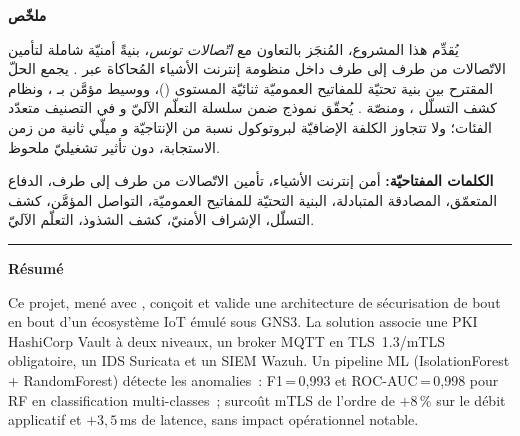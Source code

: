 \clearpage
\thispagestyle{empty}
\pagestyle{empty}

\begingroup
\setlength{\parskip}{0pt}
\setlength{\parindent}{0pt}
\renewcommand{\baselinestretch}{1.1}
\footnotesize

\begin{Arabic}
\begin{center}
  \textbf{\normalsize ملخّص}
\end{center}
\noindent يُقدِّم هذا المشروع، المُنجَز بالتعاون مع \emph{اتّصالات تونس}، بنيةً أمنيّة شاملة لتأمين الاتّصالات
من طرف إلى طرف داخل منظومة إنترنت الأشياء المُحاكاة عبر . يجمع الحلّ المقترح بين بنية تحتيّة للمفاتيح
العموميّة ثنائيّة المستوى ()، ووسيط  مؤمَّن بـ ، ونظام كشف التسلّل ،
ومنصّة . يُحقّق نموذج  ضمن سلسلة التعلّم الآليّ
 و في التصنيف متعدّد الفئات؛ ولا تتجاوز الكلفة الإضافيّة لبروتوكول 
نسبة  من الإنتاجيّة و ميلّي ثانية من زمن الاستجابة، دون تأثير تشغيليّ ملحوظ.

\smallskip
\noindent\textbf{الكلمات المفتاحيّة:}
أمن إنترنت الأشياء، تأمين الاتّصالات من طرف إلى طرف، الدفاع المتعمّق، المصادقة المتبادلة، البنية التحتيّة للمفاتيح العموميّة، التواصل  المؤمَّن، كشف التسلّل، الإشراف الأمنيّ، كشف الشذوذ، التعلّم الآليّ.
\end{Arabic}

\vspace{4pt}\noindent\rule{\linewidth}{0.4pt}\vspace{4pt}

\begin{center}
  \textbf{\normalsize Résumé}
\end{center}
\noindent Ce projet, mené avec \TT{}, conçoit et valide une architecture de sécurisation de bout en bout d'un
écosystème IoT émulé sous GNS3. La solution associe une PKI HashiCorp Vault à deux niveaux, un broker MQTT
en TLS~1.3/mTLS obligatoire, un IDS Suricata et un SIEM Wazuh. Un pipeline ML (IsolationForest + RandomForest)
détecte les anomalies~: F1\,=\,0,993 et ROC-AUC\,=\,0,998 pour RF en classification multi-classes~; surcoût mTLS de l'ordre de \(+8\)\,\% sur le débit
applicatif et \(+3{,}5\)\,ms de latence, sans impact opérationnel notable.

